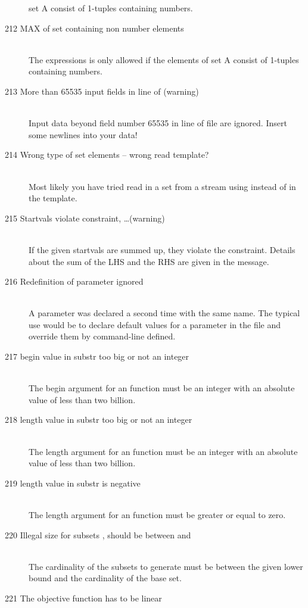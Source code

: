 \begin{description}
   set A consist of 1-tuples containing numbers.  
\item[212 MAX of set containing non number elements]\ \\
   The expressions  is only allowed if the elements of 
   set A consist of 1-tuples containing numbers.  
\item[213 More than 65535 input fields in line \code{xxx} of
   \code{yyy} (warning)]\ \\
   Input data beyond field number 65535 in line  of file
    are ignored. Insert some newlines into your data!
\item[214 Wrong type of set elements -- wrong read template?]\ \\
   Most likely you have tried read in a set from a stream using
    instead of  in the template. 
\item[215 Startvals violate constraint, \ldots (warning)]\ \\
   If the given startvals are summed up, they violate the
   constraint. Details about the sum of the LHS and the RHS are given
   in the message.
\item[216 Redefinition of parameter \code{xxx} ignored]\ \\
   A parameter was declared a second time with the same name. The
   typical use would be to declare default values for a parameter in
   the \zimpl file and override them by command-line defined.
\item[217 begin value \code{xxx} in substr too big or not an integer]\ \\
   The begin argument for an  function
   must be an integer with an absolute value of less than two billion.
\item[218 length value \code{xxx} in substr too big or not an integer]\ \\
   The length argument for an  function
   must be an integer with an absolute value of less than two billion.
\item[219 length value \code{xxx} in substr is negative]\ \\
   The length argument for an  function
   must be greater or equal to zero.
\item[220 Illegal size for subsets \code{xxx}, should be between \code{yyy} 
  and \code{zzz}]\ \\
  The cardinality of the subsets to generate must be between the
  given lower bound and the cardinality of the base set.
\item[221 The objective function has to be linear]\ \\

\end{description}
